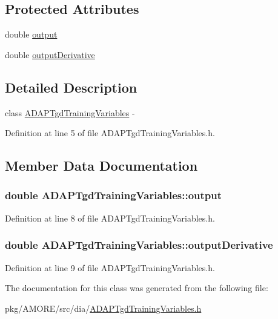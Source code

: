 \subsection*{Protected Attributes}
\begin{DoxyCompactItemize}
\item 
double \hyperlink{class_a_d_a_p_tgd_training_variables_a984b9cb08bd5cb958a53e1312eafaf58}{output}
\item 
double \hyperlink{class_a_d_a_p_tgd_training_variables_aa1b5745247a6d4b910d29fccd6fe2f1a}{outputDerivative}
\end{DoxyCompactItemize}


\subsection{Detailed Description}
class \hyperlink{class_a_d_a_p_tgd_training_variables}{ADAPTgdTrainingVariables} -\/ 

Definition at line 5 of file ADAPTgdTrainingVariables.h.



\subsection{Member Data Documentation}
\hypertarget{class_a_d_a_p_tgd_training_variables_a984b9cb08bd5cb958a53e1312eafaf58}{
\subsubsection[{output}]{\setlength{\rightskip}{0pt plus 5cm}double {\bf ADAPTgdTrainingVariables::output}}}
\label{class_a_d_a_p_tgd_training_variables_a984b9cb08bd5cb958a53e1312eafaf58}


Definition at line 8 of file ADAPTgdTrainingVariables.h.

\hypertarget{class_a_d_a_p_tgd_training_variables_aa1b5745247a6d4b910d29fccd6fe2f1a}{
\subsubsection[{outputDerivative}]{\setlength{\rightskip}{0pt plus 5cm}double {\bf ADAPTgdTrainingVariables::outputDerivative}}}
\label{class_a_d_a_p_tgd_training_variables_aa1b5745247a6d4b910d29fccd6fe2f1a}


Definition at line 9 of file ADAPTgdTrainingVariables.h.



The documentation for this class was generated from the following file:\begin{DoxyCompactItemize}
\item 
pkg/AMORE/src/dia/\hyperlink{_a_d_a_p_tgd_training_variables_8h}{ADAPTgdTrainingVariables.h}\end{DoxyCompactItemize}
